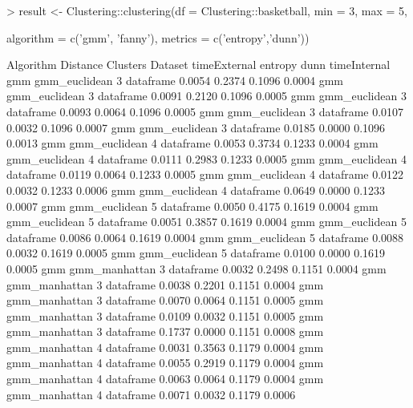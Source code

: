 \begin{Schunk}
\begin{Sinput}
> result <- Clustering::clustering(df = Clustering::basketball, min = 3, max = 5,
\end{Sinput}
\begin{Sinput}
            algorithm = c('gmm', 'fanny'), metrics = c('entropy','dunn'))
\end{Sinput}
\begin{Soutput}
Algorithm    Distance     Clusters   Dataset   timeExternal entropy   dunn  timeInternal
     gmm   gmm_euclidean    3       dataframe    0.0054      0.2374  0.1096    0.0004
     gmm   gmm_euclidean    3       dataframe    0.0091      0.2120  0.1096    0.0005
     gmm   gmm_euclidean    3       dataframe    0.0093      0.0064  0.1096    0.0005
     gmm   gmm_euclidean    3       dataframe    0.0107      0.0032  0.1096    0.0007
     gmm   gmm_euclidean    3       dataframe    0.0185      0.0000  0.1096    0.0013
     gmm   gmm_euclidean    4       dataframe    0.0053      0.3734  0.1233    0.0004
     gmm   gmm_euclidean    4       dataframe    0.0111      0.2983  0.1233    0.0005
     gmm   gmm_euclidean    4       dataframe    0.0119      0.0064  0.1233    0.0005
     gmm   gmm_euclidean    4       dataframe    0.0122      0.0032  0.1233    0.0006
     gmm   gmm_euclidean    4       dataframe    0.0649      0.0000  0.1233    0.0007
     gmm   gmm_euclidean    5       dataframe    0.0050      0.4175  0.1619    0.0004
     gmm   gmm_euclidean    5       dataframe    0.0051      0.3857  0.1619    0.0004
     gmm   gmm_euclidean    5       dataframe    0.0086      0.0064  0.1619    0.0004
     gmm   gmm_euclidean    5       dataframe    0.0088      0.0032  0.1619    0.0005
     gmm   gmm_euclidean    5       dataframe    0.0100      0.0000  0.1619    0.0005
     gmm   gmm_manhattan    3       dataframe    0.0032      0.2498  0.1151    0.0004
     gmm   gmm_manhattan    3       dataframe    0.0038      0.2201  0.1151    0.0004
     gmm   gmm_manhattan    3       dataframe    0.0070      0.0064  0.1151    0.0005
     gmm   gmm_manhattan    3       dataframe    0.0109      0.0032  0.1151    0.0005
     gmm   gmm_manhattan    3       dataframe    0.1737      0.0000  0.1151    0.0008
     gmm   gmm_manhattan    4       dataframe    0.0031      0.3563  0.1179    0.0004
     gmm   gmm_manhattan    4       dataframe    0.0055      0.2919  0.1179    0.0004
     gmm   gmm_manhattan    4       dataframe    0.0063      0.0064  0.1179    0.0004
     gmm   gmm_manhattan    4       dataframe    0.0071      0.0032  0.1179    0.0006

\end{Soutput}
\end{Schunk}
